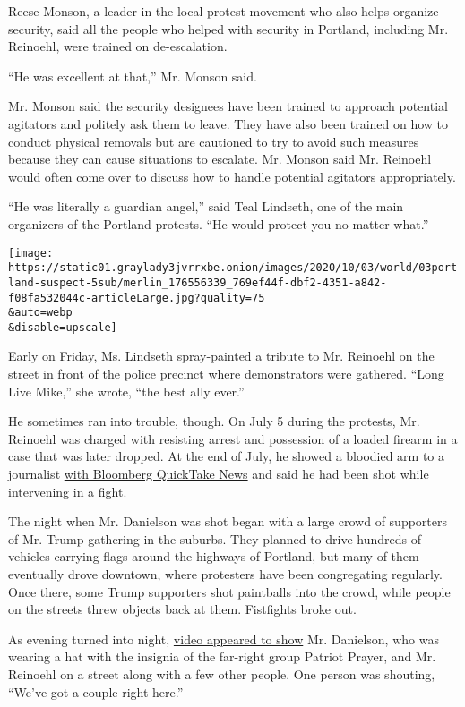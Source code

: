 Reese Monson, a leader in the local protest movement who also helps
organize security, said all the people who helped with security in
Portland, including Mr. Reinoehl, were trained on de-escalation.

``He was excellent at that,'' Mr. Monson said.

Mr. Monson said the security designees have been trained to approach
potential agitators and politely ask them to leave. They have also been
trained on how to conduct physical removals but are cautioned to try to
avoid such measures because they can cause situations to escalate. Mr.
Monson said Mr. Reinoehl would often come over to discuss how to handle
potential agitators appropriately.

``He was literally a guardian angel,'' said Teal Lindseth, one of the
main organizers of the Portland protests. ``He would protect you no
matter what.''

\texttt{[image: https://static01.graylady3jvrrxbe.onion/images/2020/10/03/world/03portland-suspect-5sub/merlin\_176556339\_769ef44f-dbf2-4351-a842-f08fa532044c-articleLarge.jpg?quality=75\\\&auto=webp\\\&disable=upscale]}

Early on Friday, Ms. Lindseth spray-painted a tribute to Mr. Reinoehl on
the street in front of the police precinct where demonstrators were
gathered. ``Long Live Mike,'' she wrote, ``the best ally ever.''

He sometimes ran into trouble, though. On July 5 during the protests,
Mr. Reinoehl was charged with resisting arrest and possession of a
loaded firearm in a case that was later dropped. At the end of July, he
showed a bloodied arm to a journalist
\href{https://www.youtube.com/watch?v=gfMnZX7Z56o}{with Bloomberg
QuickTake News} and said he had been shot while intervening in a fight.

The night when Mr. Danielson was shot began with a large crowd of
supporters of Mr. Trump gathering in the suburbs. They planned to drive
hundreds of vehicles carrying flags around the highways of Portland, but
many of them eventually drove downtown, where protesters have been
congregating regularly. Once there, some Trump supporters shot
paintballs into the crowd, while people on the streets threw objects
back at them. Fistfights broke out.

As evening turned into night,
\href{https://www.nytimes3xbfgragh.onion/2020/08/31/video/portland-protests-shooting-investigation.html}{video
appeared to show} Mr. Danielson, who was wearing a hat with the insignia
of the far-right group Patriot Prayer, and Mr. Reinoehl on a street
along with a few other people. One person was shouting, ``We've got a
couple right here.''

